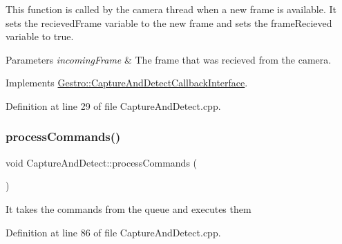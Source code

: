 This function is called by the camera thread when a new frame is available. It sets the recieved\+Frame variable to the new frame and sets the frame\+Recieved variable to true.


\begin{DoxyParams}{Parameters}
{\em incoming\+Frame} & The frame that was recieved from the camera. \\
\hline
\end{DoxyParams}


Implements \hyperlink{class_gestro_1_1_capture_and_detect_callback_interface_a9a42d0f1b3fd64cea607eeb4e6a46287}{Gestro\+::\+Capture\+And\+Detect\+Callback\+Interface}.



Definition at line 29 of file Capture\+And\+Detect.\+cpp.

\mbox{\label{class_gestro_1_1_capture_and_detect_a5747ba4779f2f30b599c5082088841ed}} 
\subsubsection{\texorpdfstring{process\+Commands()}{processCommands()}}
{\footnotesize\ttfamily void Capture\+And\+Detect\+::process\+Commands (\begin{DoxyParamCaption}{ }\end{DoxyParamCaption})\hspace{0.3cm}{\ttfamily [private]}}

It takes the commands from the queue and executes them 

Definition at line 86 of file Capture\+And\+Detect.\+cpp.

